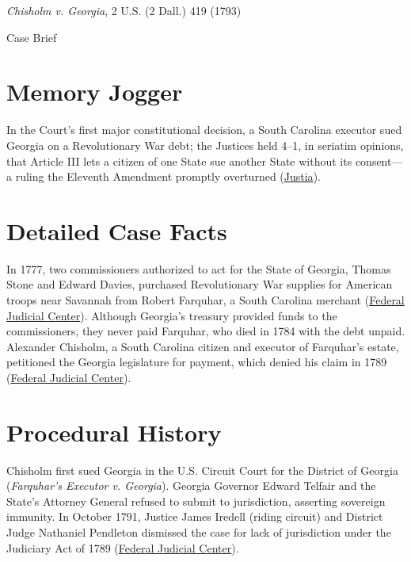 \documentclass[12pt]{article}
\begin{document}
\begin{center}
{\LARGE \textit{Chisholm v. Georgia}, 2 U.S. (2 Dall.) 419 (1793)\par}
\vspace{0.8em}
{\large Case Brief\par}
\end{center}
\vspace{1em}

\section{Memory Jogger}
In the Court's first major constitutional decision, a South Carolina executor sued Georgia on a Revolutionary War debt; the Justices held 4--1, in seriatim opinions, that Article III lets a citizen of one State sue another State without its consent---a ruling the Eleventh Amendment promptly overturned (\href{https://supreme.justia.com/cases/federal/us/2/419/}{Justia}).

\section{Detailed Case Facts}
In 1777, two commissioners authorized to act for the State of Georgia, Thomas Stone and Edward Davies, purchased Revolutionary War supplies for American troops near Savannah from Robert Farquhar, a South Carolina merchant (\href{https://www.fjc.gov/history/cases/cases-that-shaped-the-federal-courts/chisholm-v-georgia}{Federal Judicial Center}). Although Georgia's treasury provided funds to the commissioners, they never paid Farquhar, who died in 1784 with the debt unpaid. Alexander Chisholm, a South Carolina citizen and executor of Farquhar's estate, petitioned the Georgia legislature for payment, which denied his claim in 1789 (\href{https://www.fjc.gov/history/cases/cases-that-shaped-the-federal-courts/chisholm-v-georgia}{Federal Judicial Center}).

\section{Procedural History}
Chisholm first sued Georgia in the U.S. Circuit Court for the District of Georgia (\emph{Farquhar's Executor v. Georgia}). Georgia Governor Edward Telfair and the State's Attorney General refused to submit to jurisdiction, asserting sovereign immunity. In October 1791, Justice James Iredell (riding circuit) and District Judge Nathaniel Pendleton dismissed the case for lack of jurisdiction under the Judiciary Act of 1789 (\href{https://www.fjc.gov/history/cases/cases-that-shaped-the-federal-courts/chisholm-v-georgia}{Federal Judicial Center}).
\end{document}
